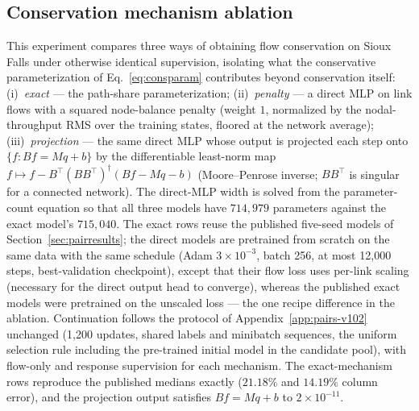 \subsection{Conservation mechanism ablation}\label{app:conservation}
This experiment compares three ways of obtaining flow conservation on
Sioux Falls under otherwise identical supervision, isolating what the
conservative parameterization of Eq.~\eqref{eq:consparam} contributes
beyond conservation itself:
(i)~\emph{exact} --- the path-share parameterization;
(ii)~\emph{penalty} --- a direct MLP on link flows with a squared
node-balance penalty (weight $1$, normalized by the nodal-throughput
RMS over the training states, floored at the network average);
(iii)~\emph{projection} --- the same direct MLP whose output is
projected each step onto $\{f:Bf=Mq+b\}$ by the differentiable
least-norm map $f\mapsto f-B^{\!\top}(BB^{\!\top})^{\dagger}(Bf-Mq-b)$
(Moore--Penrose inverse; $BB^{\!\top}$ is singular for a connected
network). The direct-MLP width is solved from the parameter-count
equation so that all three models have $714{,}979$ parameters against
the exact model's $715{,}040$. The exact rows reuse the published
five-seed models of Section~\ref{sec:pairresults}; the direct models
are pretrained from scratch on the same data with the same schedule
(Adam $3\times10^{-3}$, batch 256, at most 12{,}000 steps,
best-validation checkpoint), except that their flow loss uses per-link
scaling (necessary for the direct output head to converge), whereas
the published exact models were pretrained on the unscaled loss ---
the one recipe difference in the ablation. Continuation follows the
protocol of Appendix~\ref{app:pairs-v102} unchanged (1{,}200 updates,
shared labels and minibatch sequences, the uniform selection rule
including the pre-trained initial model in the candidate pool), with
flow-only and response supervision for each mechanism. The
exact-mechanism rows reproduce the published medians exactly ($21.18\%$
and $14.19\%$ column error), and the projection output satisfies
$Bf=Mq+b$ to $2\times10^{-11}$.

